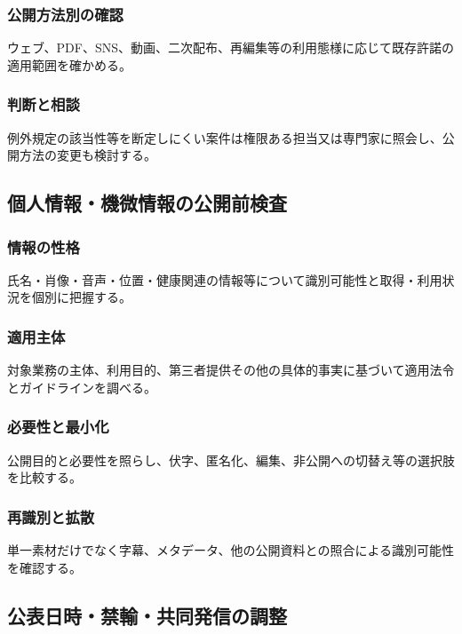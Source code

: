 \documentclass[a4paper,11pt]{article}
\begin{document}
\subsubsection{公開方法別の確認}
\par ウェブ、PDF、SNS、動画、二次配布、再編集等の利用態様に応じて既存許諾の適用範囲を確かめる。\par\medskip
\subsubsection{判断と相談}
\par 例外規定の該当性等を断定しにくい案件は権限ある担当又は専門家に照会し、公開方法の変更も検討する。\par\medskip
\subsection{個人情報・機微情報の公開前検査}
\subsubsection{情報の性格}
\par 氏名・肖像・音声・位置・健康関連の情報等について識別可能性と取得・利用状況を個別に把握する。\par\medskip
\subsubsection{適用主体}
\par 対象業務の主体、利用目的、第三者提供その他の具体的事実に基づいて適用法令とガイドラインを調べる。\par\medskip
\subsubsection{必要性と最小化}
\par 公開目的と必要性を照らし、伏字、匿名化、編集、非公開への切替え等の選択肢を比較する。\par\medskip
\subsubsection{再識別と拡散}
\par 単一素材だけでなく字幕、メタデータ、他の公開資料との照合による識別可能性を確認する。\par\medskip
\subsection{公表日時・禁輸・共同発信の調整}
\end{document}
